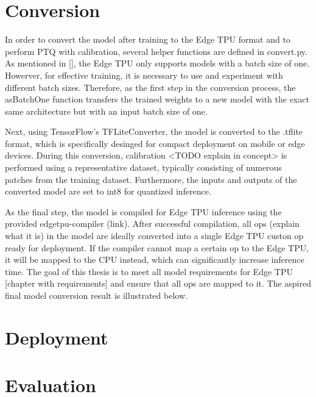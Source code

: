 {\section{Conversion}

In order to convert the model after training to the Edge TPU format and to perform PTQ with calibration, several helper functions are defined in convert.py. As mentioned in [], the Edge TPU only supports models with a batch size of one. Howerver, for effective training, it is necessary to use and experiment with different batch sizes. Therefore, as the first step in the conversion process, the asBatchOne function transfers the trained weights to a new model with the exact same architecture but with an input batch size of one.

Next, using TensorFlow's TFLiteConverter, the model is converted to the .tflite format, which is specifically desinged for compact deployment on mobile or edge devices. During this conversion, calibration <TODO explain in concept> is performed using a representative dataset, typically consisting of numerous patches from the training dataset. Furthermore, the inputs and outputs of the converted model are set to int8 for quantized inference.

As the final step, the model is compiled for Edge TPU inference using the provided edgetpu-compiler (link). After successful compilation, all ops (explain what it is) in the model are ideally converted into a single Edge TPU custon op ready for deployment. If the compiler cannot map a certain op to the Edge TPU, it will be mapped to the CPU instead, which can significantly increase inference time. The goal of this thesis is to meet all model requirements for Edge TPU [chapter with requirements] and ensure that all ops are mapped to it. The aspired final model conversion result is illustrated below.


\section{Deployment}

\section{Evaluation}


}